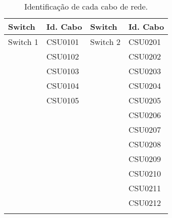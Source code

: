 \begin{table}[h!]
	\centering
	\caption{Identificação de cada cabo de rede.}
	\label{tab5} %
\begin{tabular}{|l|l|l|l|}
\hline
Switch   & Id. Cabo & Switch   & Id. Cabo \\ \hline
Switch 1 & CSU0101  & Switch 2 & CSU0201  \\ \hline
         & CSU0102  &          & CSU0202  \\ \hline
         & CSU0103  &          & CSU0203  \\ \hline
         & CSU0104  &          & CSU0204  \\ \hline
         & CSU0105  &          & CSU0205  \\ \hline
         &          &          & CSU0206  \\ \hline
         &          &          & CSU0207  \\ \hline
         &          &          & CSU0208  \\ \hline
         &          &          & CSU0209  \\ \hline
         &          &          & CSU0210  \\ \hline
         &          &          & CSU0211  \\ \hline
         &          &          & CSU0212  \\ \hline
         &          &          &          \\ \hline
\end{tabular}
\end{table}



















